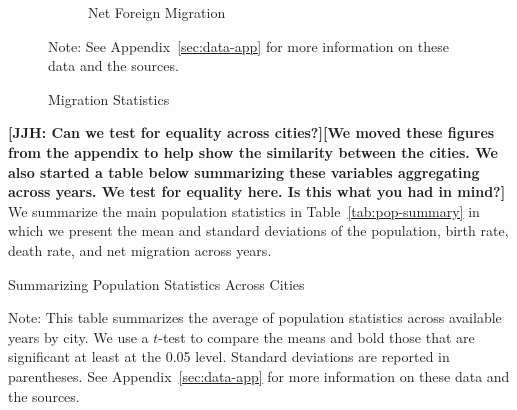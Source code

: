 \begin{figure}[H]
\begin{center}
\begin{subfigure}[ht]{0.48\textwidth}
        \caption{Net Foreign Migration}
        \end{subfigure}
      \caption{Migration Statistics}  \label{fig:emigr-immigr}
      \end{center}
         \raggedright  Note: See Appendix~\ref{sec:data-app} for more information on these data and the sources.
    \end{figure}
   
   \textbf{[JJH: Can we test for equality across cities?][We moved these figures from the appendix to help show the similarity between the cities. We also started a table below summarizing these variables aggregating across years. We test for equality here. Is this what you had in mind?]}
    We summarize the main population statistics in Table~\ref{tab:pop-summary} in which we present the mean and standard deviations of the population, birth rate, death rate, and net migration across years.
    

    \begin{table}[H]
    \centering
    \caption{Summarizing Population Statistics Across Cities}
    \begin{threeparttable}
	\label{tab:pop-summary}
	
\begin{tablenotes}
\item \footnotesize Note: This table summarizes the average of population statistics across available years by city. We use a $t$-test to compare the means and bold those that are significant at least at the 0.05 level. Standard deviations are reported in parentheses. See Appendix~\ref{sec:data-app} for more information on these data and the sources.
\end{tablenotes}
\end{threeparttable}
\end{table}
	
    